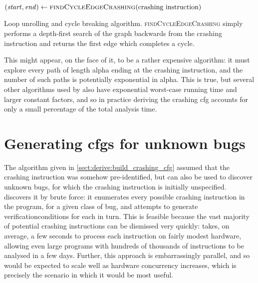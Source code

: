 \begin{sanefig}
\begin{algorithmic}
     \State $(\mathit{start}, \mathit{end}) \gets \textsc{findCycleEdgeCrashing}(\text{crashing instruction})$
        \EndFor
     \EndIf
  \EndWhile
  \EndFunction
\end{algorithmic}
\caption{Loop unrolling and cycle breaking algorithm.
  \textsc{findCycleEdgeCrashing} simply performs a depth-first search
  of the graph backwards from the crashing instruction and returns the
  first edge which completes a cycle.}
\label{fig:derive:read:unroll_cycle_break}
\end{sanefig}

This might appear, on the face of it, to be a rather expensive
algorithm: it must explore every path of length \gls{alpha} ending at
the crashing instruction, and the number of such paths is potentially
exponential in \gls{alpha}.  This is true, but several other
algorithms used by {\implementation} also have exponential worst-case
running time and larger constant factors, and so in practice deriving
the crashing \gls{cfg} accounts for only a small percentage of the
total analysis time.

\section[Generating \glsentryplural{cfg} for unknown bugs]{Generating \glspl{cfg} for unknown bugs}
\label{sect:derive:unknown_bugs}

The algorithm given in \autoref{sect:derive:build_crashing_cfg}
assumed that the \gls{crashing instruction} was somehow
pre-identified, but {\technique} can also be used to discover unknown
bugs, for which the \gls{crashing instruction} is initially
unspecified.  {\Technique} discovers it by brute force: it enumerates
every possible \gls{crashing instruction} in the program, for a given
class of bug, and attempts to generate \glspl{verificationcondition}
for each in turn.  This is feasible because the vast majority of
potential \glspl{crashing instruction} can be dismissed very quickly:
{\implementation} takes, on average, a few seconds to process each
instruction on fairly modest hardware, allowing even large programs
with hundreds of thousands of instructions to be analysed in a few
days.  Further, this approach is embarrassingly parallel, and so would
be expected to scale well as hardware concurrency increases, which is
precisely the scenario in which it would be most useful.

